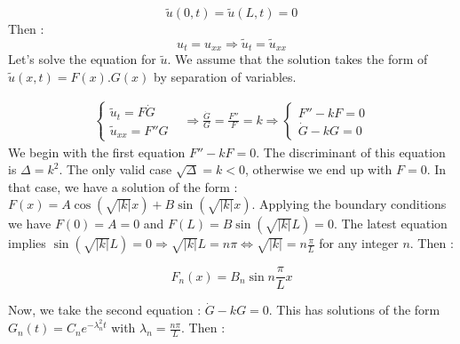 \documentclass[a4paper, twoside, 11pt]{report}
\theoremstyle{theorem}
\theoremstyle{remark}
\theoremstyle{exemple}
\begin{document}
                    \begin{equation*}
                       \widetilde{u}(0,t)=\widetilde{u}(L,t)=0
                    \end{equation*}
                Then :
                    \[
                        u_t = u_{xx} \Longrightarrow \widetilde{u}_t = \widetilde{u}_{xx}
                    \]
                Let's solve the equation for $\widetilde{u}$. We assume that the solution takes the form of $\widetilde{u}(x,t)=F(x).G(x)$ by separation of variables.

                    \begin{align*}
                        \left\{ \begin{matrix}
                                    \widetilde{u}_t=F\dot{G}\\
                                    \widetilde{u}_{xx}=F''G
                              \end{matrix} \right. &\Longrightarrow \frac{\dot{G}}{G}= \frac{F''}{F}=k
                        \Longrightarrow \left\{\begin{matrix}
                                                    F''-kF=0 \\
                                                    \dot{G}-kG=0
                                                \end{matrix} \right.
                    \end{align*}
                We begin with the first equation $F''-kF=0$. The discriminant of this equation is $\Delta = k^2$. The only valid case $\sqrt{\Delta}=k<0$, otherwise we end up with $F=0$. In that case, we have a solution of the form : $F(x) = A \cos(\sqrt{|k|}x) + B \sin (\sqrt{|k|}x)$. Applying the boundary conditions we have $F(0)=A=0$ and $F(L)=B \sin (\sqrt{|k|}L)=0$. The latest equation implies $\sin(\sqrt{|k|}L)=0 \Longrightarrow \sqrt{|k|}L=n\pi \Longleftrightarrow \sqrt{|k|}=n \frac{\pi}{L}$ for any integer $n$. Then :

                    \begin{equation*}
                        F_n(x)=B_n \sin n\frac{\pi}{L}x
                        \tag{2}
                    \end{equation*}

                Now, we take the second equation : $\dot{G}-kG=0$. This has solutions of the form $G_n(t)=C_ne^{-\lambda^2_nt}$ with $\lambda_n=\frac{n\pi}{L}$. Then :
\end{document}
